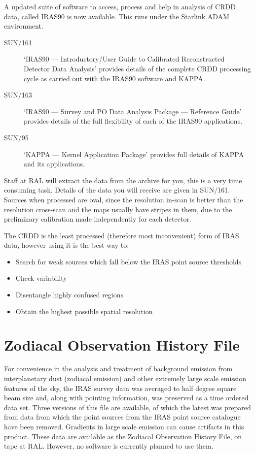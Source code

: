 A updated suite of software to access, process and help in analysis of CRDD
data, called IRAS90 is now available. This runs under the Starlink ADAM
environment.
\begin{description}
\item [SUN/161] `IRAS90 --- Introductory/User Guide to Calibrated
Reconstructed Detector Data Analysis' provides details of the complete CRDD
processing cycle as carried out with the IRAS90 software and KAPPA.
\item [SUN/163] `IRAS90 --- Survey and PO Data Analysis Package --- Reference
Guide' provides details of the full flexibility of each of the IRAS90
applications.
\item [SUN/95] `KAPPA --- Kernel Application Package' provides full details of
KAPPA and its applications.
\end{description}

Staff at RAL will extract the data from the archive for you, this is a very
time consuming task. Details of the data you will receive are given in SUN/161.
Sources when processed are oval, since the resolution in-scan is better than the
resolution cross-scan and the maps usually have stripes in them, due to the
preliminary calibration made independently for each detector.

The CRDD is the least processed (therefore most inconvenient) form of IRAS data,
however using it is the best way to:
\begin{itemize}
\item Search for weak sources which fall below the IRAS point source thresholds
\item Check variability
\item Disentangle highly confused regions
\item Obtain the highest possible spatial resolution
\end{itemize}

\section{Zodiacal Observation History File}
\label{m:zodiac}
For convenience in the analysis and treatment of background emission from
interplanetary dust (zodiacal emission) and other extremely large scale emission
features of the sky, the IRAS survey data was averaged to half degree square
beam size and, along with pointing information, was preserved as a time ordered
data set.
Three versions of this file are available, of which the latest was prepared from
data from which the point sources from the IRAS point source catalogue have been
removed. Gradients in large scale emission can cause artifacts in this product.
These data are available as the Zodiacal Observation History File, on tape at
RAL. However, no software is currently planned to use them.

